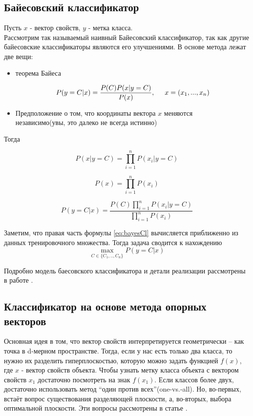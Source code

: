 \documentclass{article}
\begin{document}
\subsection{Байесовский классификатор}
Пусть $x$ - вектор свойств, $y$ - метка класса. \\
Рассмотрим так называемый наивный Байесовский классификатор, так как другие байесовские классификаторы являются его улучшениями. В основе метода лежат две вещи:
\begin{itemize}
\item{теорема Байеса}

\begin{equation}
P(y=C|x)=\frac{P(C) P(x|y=C)}{P(x)}
,\hspace{5mm} x = (x_1, ..., x_n)
\end{equation}

\item{Предположение о том, что координаты вектора $x$ меняются \\независимо(увы, это далеко не всегда истинно)}
\end{itemize}
Тогда

\begin{equation}
P(x|y=C) = \prod_{i=1}^n{P(x_i|y=C)}
\end{equation}

\begin{equation}
P(x) = \prod_{i=1}^n{P(x_i)}
\end{equation}

\begin{equation}
\label{eq:bayesCl}
P(y=C|x)=\frac{P(C) \prod_{i=1}^n{P(x_i|y=C)}}{\prod_{i=1}^n{P(x_i)}}
\end{equation}

Заметим, что правая часть формулы \eqref{eq:bayesCl} вычисляется приближенно из данных тренировочного множества.
Тогда задача сводится к нахождению
\begin{equation}
\max_{C \in \{C_1,..,C_n\}}P(y=C|x)
\end{equation}

Подробно модель баесовского классификатора и детали реализации рассмотрены в работе
\cite{murphy2006naive}.

\subsection{Классификатор на основе метода опорных\\ векторов}
Основная идея в том, что вектор свойств интерпретируется геометрически --  как точка в d-мерном пространстве. Тогда, если у нас есть только два класса, то нужно их разделить гиперплоскостью, которую можно задать функцией $f(x)$, где $x$ - вектор свойств объекта. Чтобы узнать метку класса объекта с вектором свойств $x_1$ достаточно посмотреть на знак $f(x_1)$. Если классов более двух, достаточно использовать метод ``один против всех''(one-vs.-all). Но, во-первых, встаёт вопрос существования разделяющей плоскости, а, во-вторых, выбора оптимальной плоскости. Эти вопросы рассмотрены в статье \cite{svm}.
\end{document}
